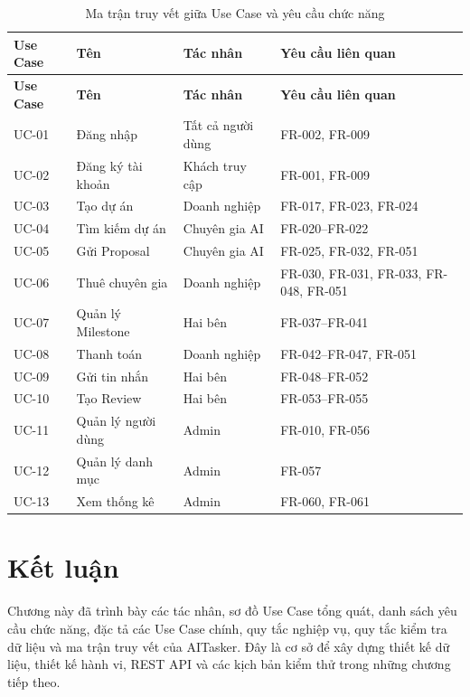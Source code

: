 \begin{longtable}{|p{2.2cm}|p{4.0cm}|p{3.0cm}|p{4.4cm}|}
\caption{Ma trận truy vết giữa Use Case và yêu cầu chức năng}
\label{tab:traceability-matrix} \\ \hline
\textbf{Use Case} & \textbf{Tên} & \textbf{Tác nhân} & \textbf{Yêu cầu liên quan} \\ \hline
\endfirsthead
\hline
\textbf{Use Case} & \textbf{Tên} & \textbf{Tác nhân} & \textbf{Yêu cầu liên quan} \\ \hline
\endhead

UC-01 & Đăng nhập & Tất cả người dùng & FR-002, FR-009 \\ \hline
UC-02 & Đăng ký tài khoản & Khách truy cập & FR-001, FR-009 \\ \hline
UC-03 & Tạo dự án & Doanh nghiệp & FR-017, FR-023, FR-024 \\ \hline
UC-04 & Tìm kiếm dự án & Chuyên gia AI & FR-020--FR-022 \\ \hline
UC-05 & Gửi Proposal & Chuyên gia AI & FR-025, FR-032, FR-051 \\ \hline
UC-06 & Thuê chuyên gia & Doanh nghiệp & FR-030, FR-031, FR-033, FR-048, FR-051 \\ \hline
UC-07 & Quản lý Milestone & Hai bên & FR-037--FR-041 \\ \hline
UC-08 & Thanh toán & Doanh nghiệp & FR-042--FR-047, FR-051 \\ \hline
UC-09 & Gửi tin nhắn & Hai bên & FR-048--FR-052 \\ \hline
UC-10 & Tạo Review & Hai bên & FR-053--FR-055 \\ \hline
UC-11 & Quản lý người dùng & Admin & FR-010, FR-056 \\ \hline
UC-12 & Quản lý danh mục & Admin & FR-057 \\ \hline
UC-13 & Xem thống kê & Admin & FR-060, FR-061 \\ \hline
\end{longtable}

\section{Kết luận}
\label{sec:chapter4-conclusion}

Chương này đã trình bày các tác nhân, sơ đồ Use Case tổng quát, danh sách yêu cầu chức năng, đặc tả các Use Case chính, quy tắc nghiệp vụ, quy tắc kiểm tra dữ liệu và ma trận truy vết của AITasker. Đây là cơ sở để xây dựng thiết kế dữ liệu, thiết kế hành vi, REST API và các kịch bản kiểm thử trong những chương tiếp theo.
